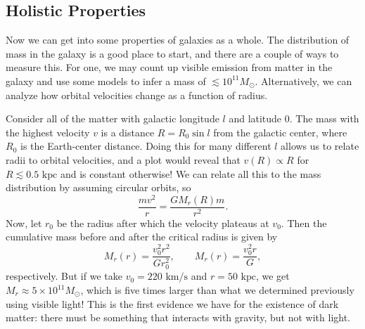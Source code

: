 \documentclass[../a062main.tex]{subfiles}
\begin{document}
\subsection*{Holistic Properties}
Now we can get into some properties of galaxies as a whole.
The distribution of mass in the galaxy is a good place to start, and there are a couple of ways to measure this.
For one, we may count up visible emission from matter in the galaxy and use some models to infer a mass of $\lesssim 10^{11} M_\odot$.
Alternatively, we can analyze how orbital velocities change as a function of radius.

Consider all of the matter with galactic longitude $l$ and latitude 0.
The mass with the highest velocity $v$ is a distance $R = R_0 \sin l$ from the galactic center, where $R_0$ is the Earth-center distance.
Doing this for many different $l$ allows us to relate radii to orbital velocities, and a plot would reveal that $v(R) \propto R$ for $R \lesssim 0.5 \text{ kpc}$ and is constant otherwise!
We can relate all this to the mass distribution by assuming circular orbits, so
\[ \frac{mv^2}{r} = \frac{GM_r(R) m}{r^2}. \]
Now, let $r_0$ be the radius after which the velocity plateaus at $v_0$.
Then the cumulative mass before and after the critical radius is given by
\[ M_r(r) = \frac{v_0^2 r^2}{G r_0^2}, \qquad M_r(r) = \frac{v_0^2 r}{G}, \]
respectively.
But if we take $v_0 = 220 \text{ km/s}$ and $r = 50 \text{ kpc}$, we get $M_r \approx 5 \times 10^{11} M_\odot$, which is five times larger than what we determined previously using visible light!
This is the first evidence we have for the existence of dark matter: there must be something that interacts with gravity, but not with light.
\end{document}
